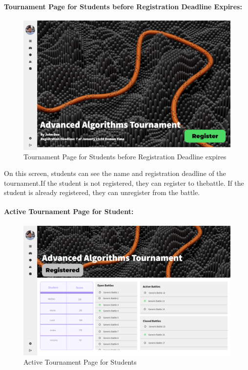 \documentclass{article}
\begin{document}
\paragraph{Tournament Page for Students before Registration Deadline Expires:}

\begin{figure}[H]
    \centering
    \includegraphics[width=1\textwidth]{images/UI/Tournament Page before Registration Deadline Student not registered.png}
    \caption{Tournament Page for Students before Registration Deadline expires}
    \label{fig:TournamentPageForStudentsBeforeRegistrationDeadline}
\end{figure}

On this screen, students can see the name and registration deadline of the tournament.If the student
is not registered, they can register to thebattle. If the student is already registered, they can 
unregister from the battle.

\paragraph{Active Tournament Page for Student:}

\begin{figure}[H]
    \centering
    \includegraphics[width=1\textwidth]{images/UI/Tournament Page Active.png}
    \caption{Active Tournament Page for Students}
    \label{fig:ActiveTournamentPageForStudents}
\end{figure}
\end{document}
